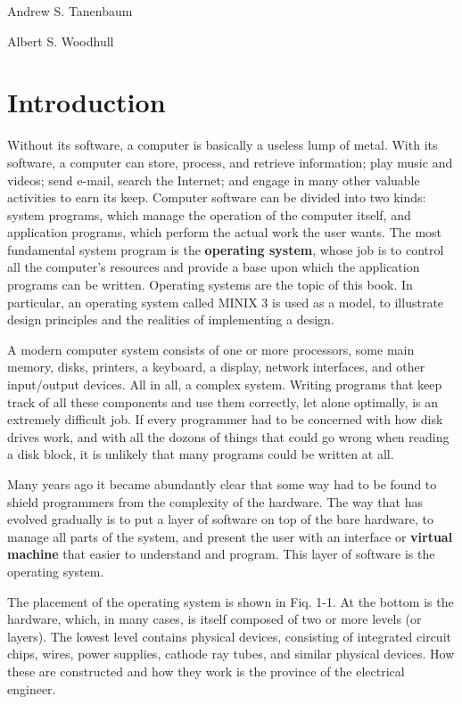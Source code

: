 \documentclass{book}
\newcommand {\kw}  [1] {\textbf{#1}}
\begin{document}
Andrew S. Tanenbaum

Albert S. Woodhull


\chapter{Introduction}
Without its software, a computer is basically a useless lump of metal.
With its software, a computer can store, process, and retrieve information; 
play music and videos; send e-mail, search the Internet; and engage in many other valuable activities to earn its keep.
Computer software can be divided into two kinds: system programs, which manage the operation of the computer itself, 
and application programs, which perform the actual work the user wants.
The most fundamental system program is the \kw{operating system}, whose job is to control all the computer's resources and 
provide a base upon which the application programs can be written.
Operating systems are the topic of this book.
In particular, an operating system called MINIX 3 is used as a model, to illustrate design principles and the realities of implementing a design.

A modern computer system consists of one or more processors, some main memory, disks, 
printers, a keyboard, a display, network interfaces, and other input/output devices. 
All in all, a complex system.
Writing programs that keep track of all these components and use them correctly, let alone optimally, is an extremely difficult job.
If every programmer had to be concerned with how disk drives work, and with all the dozons of things that could go wrong when reading a disk block, 
it is unlikely that many programs could be written at all.

Many years ago it became abundantly clear that some way had to be found to shield programmers from the complexity of the hardware.
The way that has evolved gradually is to put a layer of software on top of the bare hardware, 
to manage all parts of the system, and present the user with an interface or \kw{virtual machine} that easier to understand and program.
This layer of software is the operating system.

The placement of the operating system is shown in Fiq. 1-1.
At the bottom is the hardware, which, in many cases, is itself composed of two or more levels (or layers).
The lowest level contains physical devices, consisting of integrated circuit chips, wires, power supplies, cathode ray tubes, and similar physical devices.
How these are constructed and how they work is the province of the electrical engineer.
\end{document}
